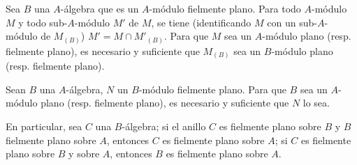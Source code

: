 \begin{env}[6.6.3]
\label{0.6.6.3-fr}
Sea $B$ una $A$-álgebra que es un $A$-módulo fielmente plano. Para todo
$A$-módulo $M$ y todo sub-$A$-módulo $M'$ de $M$, se tiene (identificando $M$
con un sub-$A$-módulo de $M_{(B)}$) $M'=M\cap M'_{(B)}$. Para que $M$ sea un
$A$-módulo plano (resp. fielmente plano), es necesario y suficiente que $M_{(B)}$
sea un $B$-módulo plano (resp. fielmente plano).
\end{env}

\begin{env}[6.6.4]
\label{0.6.6.4-fr}
Sean $B$ una $A$-álgebra, $N$ un $B$-módulo fielmente plano. Para que $B$
sea un $A$-módulo plano (resp. fielmente plano), es necesario y suficiente que $N$
lo sea.

En particular, sea $C$ una $B$-álgebra; si el anillo $C$ es fielmente
plano sobre $B$ y $B$ fielmente plano sobre $A$, entonces $C$ es fielmente plano
sobre $A$; si $C$ es fielmente plano sobre $B$ y sobre $A$, entonces $B$ es
fielmente plano sobre $A$.
\end{env}

